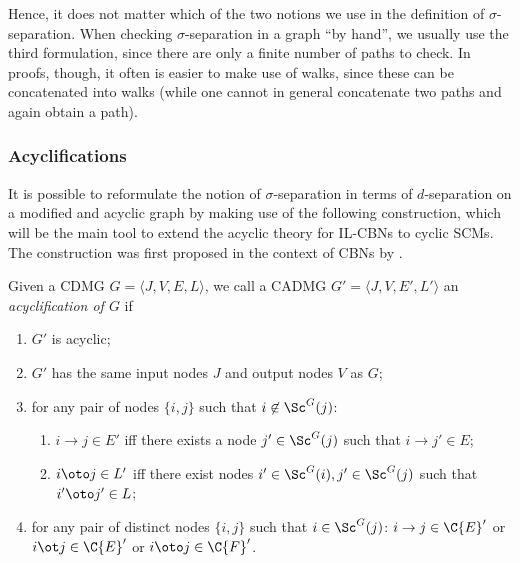 Hence, it does not matter which of the two notions we use in the definition of $\sigma$-separation.
When checking $\sigma$-separation in a graph ``by hand'', we usually use the third formulation, since there are only a finite
number of paths to check. In proofs, though, it often is easier to make use of walks, since these can be concatenated into walks
(while one cannot in general concatenate two paths and again obtain a path).

\subsubsection{Acyclifications}

It is possible to reformulate the notion of $\sigma$-separation in terms of $d$-separation on a modified and acyclic graph
by making use of the following construction, which will be the main tool to extend the acyclic theory for
IL-CBNs to cyclic SCMs. The construction was first proposed in the context of CBNs by \cite{Spirtes94,Spirtes95}.
\begin{Def}\label{def:cdg_acyclification}
  Given a CDMG $G = \langle J, V, E, L \rangle$, we call a CADMG $G' = \langle J, V, E', L' \rangle$
  an \emph{acyclification of $G$} if
  \begin{enumerate}[label=(\roman*)]
    \item $G'$ is acyclic;
    \item $G'$ has the same input nodes $J$ and output nodes $V$ as $G$;
    \item for any pair of nodes $\{i,j\}$ such that $i \not\in\Sc^G(j)$:
      \begin{enumerate}
      \item $i \to j \in E'$ iff there exists a node $j' \in \Sc^G(j)$ such that $i \to j' \in E$;
      \item $i \oto j \in L'$ iff there exist nodes $i' \in \Sc^G(i), j' \in \Sc^G(j)$ such that $i' \oto j' \in L$;
      \end{enumerate}\label{def:acyclification_inter_scc}
    \item for any pair of distinct nodes $\{i,j\}$ such that $i \in\Sc^G(j)$: $i \to j \in \C{E}'$ or $i \ot j \in \C{E}'$ or $i \oto j \in \C{F}'$.\label{def:acyclification_intra_scc}
  \end{enumerate}
\end{Def}

